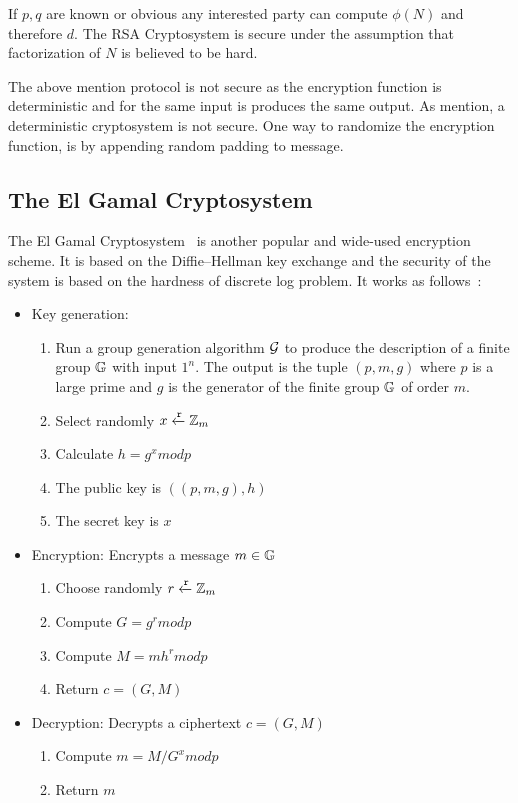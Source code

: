 If $p, q$ are known or obvious any interested party can compute $\phi(N)$ and therefore $d$. The RSA Cryptosystem is secure under the assumption that factorization of $N$ is believed to be hard.

The above mention protocol is not secure as the encryption function is deterministic and for the same input is produces the same output. As mention, a deterministic cryptosystem is not secure. One way to randomize the encryption function, is by appending random padding to message.

\subsection{The El Gamal Cryptosystem}
\label{preliminaries:pub:el_gamal}

The El Gamal Cryptosystem~\cite{el_gamal} is another popular and wide-used encryption scheme. It is based on the Diffie–Hellman key exchange and the security of the system is based on the hardness of discrete log problem. It works as follows~\cite{Katz:2014:IMC:2700550, kiagias:crypto}:

\begin{itemize}
  \item Key generation:
    \begin{enumerate}
        \item Run a group generation algorithm $\mathcal{G}$ to produce the description of a finite group $\mathbb{G}$ with input $1^{n}$. The output is the tuple $(p, m, g)$ where $p$ is a large prime and $g$ is the generator of the finite group $\mathbb{G}$ of order $m$.
        \item Select randomly $x \xleftarrow{\mathtt{r}}{\mathbb{Z}_m}$
        \item Calculate $h = g^{x}modp$
        \item The public key is $((p, m, g), h)$
        \item The secret key is $x$
    \end{enumerate}
  \item Encryption: Encrypts a message $m \in \mathbb{G}$
    \begin{enumerate}
      \item Choose randomly $r \xleftarrow{\mathtt{r}}{\mathbb{Z}_m}$
      \item Compute $G = g^{r}modp$
      \item Compute $M = mh^{r}modp$
      \item Return $c = (G, M)$
    \end{enumerate}
  \item Decryption: Decrypts a ciphertext $c = (G, M)$
    \begin{enumerate}
      \item Compute $m = M / G^{x} modp$
      \item Return $m$
    \end{enumerate}
\end{itemize}

